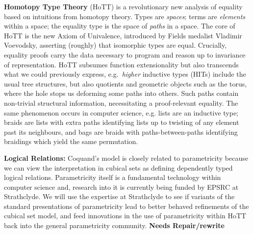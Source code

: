 \documentclass[a4paper,11pt]{article}
\begin{document}
{\bf Homotopy Type Theory} (HoTT) is a revolutionary new analysis of
equality based on intuitions from homotopy theory. Types are
\emph{spaces}; terms are \emph{elements} within a space; the equality
type is the space of \emph{paths} in a space. The core of HoTT is the
new Axiom of Univalence, introduced by Fields medalist Vladimir
Voevodsky, asserting (roughly) that isomorphic types are
equal. Crucially, equality proofs carry the data necessary to program
and reason up to invariance of representation. HoTT subsumes function
extensionality but also transcends what we could previously express,
e.g.\ \emph{higher} inductive types (HITs) include the usual tree
structures, but also quotients \cite{alti:mpc04} and geometric objects such as the
torus, where the hole stops us deforming some paths into others. Such
paths contain non-trivial structural information, necessitating a
proof-relevant equality. The same phenomenon occurs in computer
science, e.g. lists are an inductive type; braids are lists with extra
paths identifying lists up to twisting of any element past its
neighbours, and bags are braids with paths-between-paths identifying
braidings which yield the same permutation.

{\bf Logical Relations:} Coquand's model is closely related to
parametricity because we can view the interpretation in cubical sets
as defining dependently typed logical relations.
Parametricity
itself is a fundamental technology within computer science and,
research into it is currently being funded by EPSRC at Strathclyde. We
will use the expertise at Strathclyde to see if variants of the
standard presentations of parametricity lead to better behaved
refinements of the cubical set model, and feed innovations in the use
of parametricity within HoTT back into the general parametricity
community. {\bf Needs Repair/rewrite}



\end{document}
